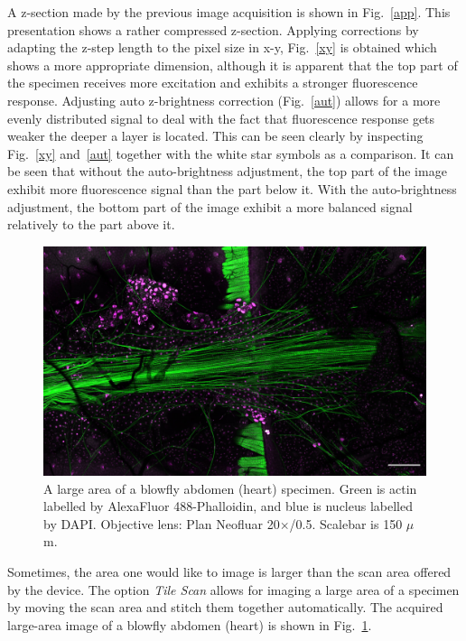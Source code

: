 A z-section made by the previous image acquisition is shown in Fig.~\ref{app}. 
This presentation shows a rather compressed z-section. 
Applying corrections by adapting the z-step length to the pixel size in x-y, Fig.~\ref{xy} is obtained which shows a more appropriate dimension, although it is apparent that the top part of the specimen receives more excitation and exhibits a stronger fluorescence response. 
Adjusting auto z-brightness correction (Fig.~\ref{aut}) allows for a more evenly distributed signal to deal with the fact that fluorescence response gets weaker the deeper a layer is located. 
This can be seen clearly by inspecting Fig.~\ref{xy} and~\ref{aut} together with the white star symbols as a comparison. It can be seen that without the auto-brightness adjustment, the top part of the image exhibit more fluorescence signal than the part below it. With the auto-brightness adjustment, the bottom part of the image exhibit a more balanced signal relatively to the part above it.

\begin{figure}[h!]
\centering
\includegraphics[width=0.7\columnwidth]{Exp_3_LSM/Figures/MS3/F5mg_150um}	
\caption{ A large area of a blowfly abdomen (heart) specimen. 
Green is actin labelled by AlexaFluor 488-Phalloidin, and blue is nucleus labelled by DAPI. 
Objective lens: Plan Neofluar 20$\times$/0.5. 
Scalebar is 150 $\mu$m.}
\label{fig:bloabdo}
\end{figure}

Sometimes, the area one would like to image is larger than the scan area offered by the device. 
The option \textit{Tile Scan} allows for imaging a large area of a specimen by moving the scan area and stitch them together automatically. 
The acquired large-area image of a blowfly abdomen (heart) is shown in Fig.~\ref{fig:bloabdo}.

